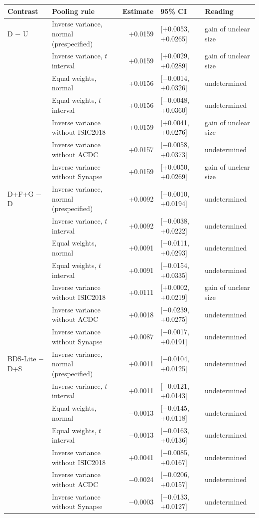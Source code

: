 \begin{tabular}{llrll}
\toprule
Contrast & Pooling rule & Estimate & 95\% CI & Reading \\
\midrule
D $-$ U & Inverse variance, normal (prespecified) & +0.0159 & [+0.0053, +0.0265] & gain of unclear size \\
 & Inverse variance, $t$ interval & +0.0159 & [+0.0029, +0.0289] & gain of unclear size \\
 & Equal weights, normal & +0.0156 & [$-$0.0014, +0.0326] & undetermined \\
 & Equal weights, $t$ interval & +0.0156 & [$-$0.0048, +0.0360] & undetermined \\
 & Inverse variance without ISIC2018 & +0.0159 & [+0.0041, +0.0276] & gain of unclear size \\
 & Inverse variance without ACDC & +0.0157 & [$-$0.0058, +0.0373] & undetermined \\
 & Inverse variance without Synapse & +0.0159 & [+0.0050, +0.0269] & gain of unclear size \\
\addlinespace
D+F+G $-$ D & Inverse variance, normal (prespecified) & +0.0092 & [$-$0.0010, +0.0194] & undetermined \\
 & Inverse variance, $t$ interval & +0.0092 & [$-$0.0038, +0.0222] & undetermined \\
 & Equal weights, normal & +0.0091 & [$-$0.0111, +0.0293] & undetermined \\
 & Equal weights, $t$ interval & +0.0091 & [$-$0.0154, +0.0335] & undetermined \\
 & Inverse variance without ISIC2018 & +0.0111 & [+0.0002, +0.0219] & gain of unclear size \\
 & Inverse variance without ACDC & +0.0018 & [$-$0.0239, +0.0275] & undetermined \\
 & Inverse variance without Synapse & +0.0087 & [$-$0.0017, +0.0191] & undetermined \\
\addlinespace
BDS-Lite $-$ D+S & Inverse variance, normal (prespecified) & +0.0011 & [$-$0.0104, +0.0125] & undetermined \\
 & Inverse variance, $t$ interval & +0.0011 & [$-$0.0121, +0.0143] & undetermined \\
 & Equal weights, normal & $-$0.0013 & [$-$0.0145, +0.0118] & undetermined \\
 & Equal weights, $t$ interval & $-$0.0013 & [$-$0.0163, +0.0136] & undetermined \\
 & Inverse variance without ISIC2018 & +0.0041 & [$-$0.0085, +0.0167] & undetermined \\
 & Inverse variance without ACDC & $-$0.0024 & [$-$0.0206, +0.0157] & undetermined \\
 & Inverse variance without Synapse & $-$0.0003 & [$-$0.0133, +0.0127] & undetermined \\
\bottomrule
\end{tabular}
